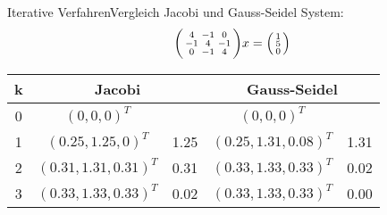 \begin{example2}{Iterative Verfahren}{Vergleich Jacobi und Gauss-Seidel}
System:
$$\begin{psmallmatrix}
4 & -1 & 0\\
-1 & 4 & -1\\
0 & -1 & 4
\end{psmallmatrix}x = \begin{psmallmatrix}
1\\
5\\
0
\end{psmallmatrix}$$

\begin{center}
\begin{tabular}{c|cc|cc}
k & \multicolumn{2}{c|}{Jacobi} & \multicolumn{2}{c}{Gauss-Seidel}\\
\hline
0 & $(0,0,0)^T$ & & $(0,0,0)^T$ &\\
1 & $(0.25,1.25,0)^T$ & 1.25 & $(0.25,1.31,0.08)^T$ & 1.31\\
2 & $(0.31,1.31,0.31)^T$ & 0.31 & $(0.33,1.33,0.33)^T$ & 0.02\\
3 & $(0.33,1.33,0.33)^T$ & 0.02 & $(0.33,1.33,0.33)^T$ & 0.00
\end{tabular}
\end{center}
\end{example2}

